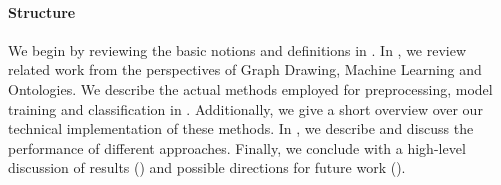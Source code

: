 \documentclass[
	fontsize=10pt, %
	twoside=false, %
	secnumdepth=1, %
  toc=indentunnumbered %
]{kaobook}
\begin{document}




\paragraph{Structure} We begin by reviewing the basic notions and definitions in
. In , we review related work from the
perspectives of Graph Drawing, Machine Learning and Ontologies.
We describe the actual methods employed for preprocessing, model training and
classification in . Additionally, we give a short overview over
our technical implementation of these methods. In ,
we describe and discuss the performance of different approaches. Finally, we
conclude with a high-level discussion of results () and
possible directions for future work ().









\end{document}
